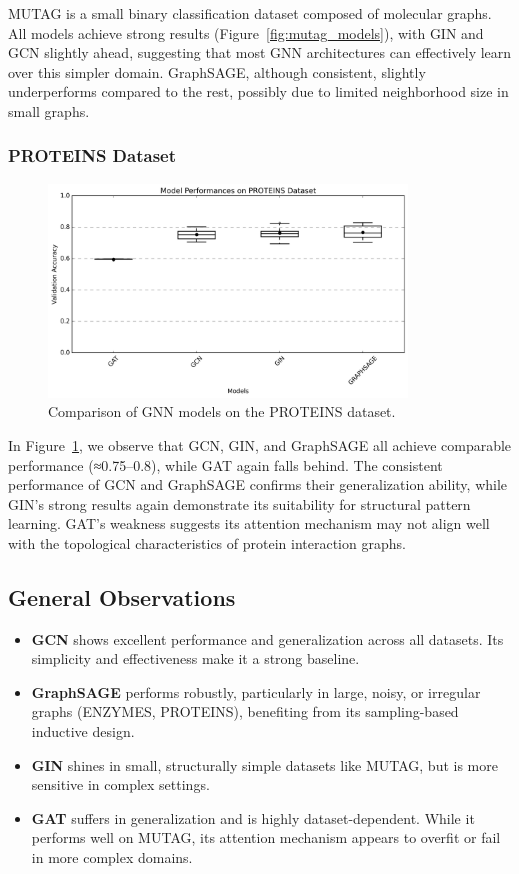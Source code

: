 \documentclass[11pt,a4paper]{article}
\begin{document}
	MUTAG is a small binary classification dataset composed of molecular graphs. All models achieve strong results (Figure~\ref{fig:mutag_models}), with GIN and GCN slightly ahead, suggesting that most GNN architectures can effectively learn over this simpler domain. GraphSAGE, although consistent, slightly underperforms compared to the rest, possibly due to limited neighborhood size in small graphs.
	
	\subsubsection*{PROTEINS Dataset}
	
	\begin{figure}[h!]
		\centering
		\includegraphics[width=0.85\textwidth]{boxplot_PROTEINS.png}
		\caption{Comparison of GNN models on the PROTEINS dataset.}
		\label{fig:proteins_models}
	\end{figure}
	
	In Figure~\ref{fig:proteins_models}, we observe that GCN, GIN, and GraphSAGE all achieve comparable performance (≈0.75–0.8), while GAT again falls behind. The consistent performance of GCN and GraphSAGE confirms their generalization ability, while GIN’s strong results again demonstrate its suitability for structural pattern learning. GAT's weakness suggests its attention mechanism may not align well with the topological characteristics of protein interaction graphs.
	
	\subsection{General Observations}
	
	\begin{itemize}
		\item \textbf{GCN} shows excellent performance and generalization across all datasets. Its simplicity and effectiveness make it a strong baseline.
		\item \textbf{GraphSAGE} performs robustly, particularly in large, noisy, or irregular graphs (ENZYMES, PROTEINS), benefiting from its sampling-based inductive design.
		\item \textbf{GIN} shines in small, structurally simple datasets like MUTAG, but is more sensitive in complex settings.
		\item \textbf{GAT} suffers in generalization and is highly dataset-dependent. While it performs well on MUTAG, its attention mechanism appears to overfit or fail in more complex domains.
	\end{itemize}
	
\end{document}
